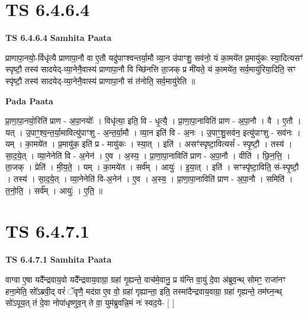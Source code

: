 \documentclass[17pt]{extarticle}
\begin{document}
\section{ TS 6.4.6.4 }

\textbf{TS 6.4.6.4 } \newline
\textbf{Samhita Paata} \newline

प्राणापा॒नयो॒-र्विधृ॑त्यै प्राणापा॒नौ वा ए॒तौ यदु॑पाꣳश्वन्तर्या॒मौ व्या॒न उ॑पाꣳशु॒ सव॑नो॒ यं का॒मये॑त प्र॒मायु॑कः स्या॒दित्यसꣳ॑ स्पृष्टौ॒ तस्य॑ सादयेद्-व्या॒नेनै॒वास्य॑ प्राणापा॒नौ वि च्छि॑नत्ति ता॒जक् प्र मी॑यते॒ यं का॒मये॑त॒ सर्व॒मायु॑रिया॒दिति॒ सꣳ स्पृ॑ष्टौ॒ तस्य॑ सादयेद्-व्या॒नेनै॒वास्य॑ प्राणापा॒नौ सं त॑नोति॒ सर्व॒मायु॑रेति ॥ \newline

\textbf{Pada Paata} \newline

प्रा॒णा॒पा॒नयो॒रिति॑ प्राण - अ॒पा॒नयोः᳚ । विधृ॑त्या॒ इति॒ वि - धृ॒त्यै॒ । प्रा॒णा॒पा॒नाविति॑ प्राण - अ॒पा॒नौ । वै । ए॒तौ । यत् । उ॒पाꣳ॒॒श्व॒न्त॒र्या॒मावित्यु॑पाꣳशु - अ॒न्त॒र्या॒मौ । व्या॒न इति॑ वि - अ॒नः । उ॒पाꣳ॒॒शु॒सव॑न॒ इत्यु॑पाꣳशु - सव॑नः । यम् । का॒मये॑त । प्र॒मायु॑क॒ इति॑ प्र - मायु॑कः । स्या॒त् । इति॑ । असꣳ॑स्पृष्टा॒वित्यसं᳚ - स्पृ॒ष्टौ॒ । तस्य॑ । सा॒द॒ये॒त् । व्या॒नेनेति॑ वि - अ॒नेन॑ । ए॒व । अ॒स्य॒ । प्रा॒णा॒पा॒नाविति॑ प्राण - अ॒पा॒नौ । वीति॑ । छि॒न॒त्ति॒ । ता॒जक् । प्रेति॑ । मी॒य॒ते॒ । यम् । का॒मये॑त । सर्व᳚म् । आयुः॑ । इ॒या॒त् । इति॑ । सꣳस्पृ॑ष्टा॒विति॒ सं-स्पृ॒ष्टौ॒ । तस्य॑ । सा॒द॒ये॒त् । व्या॒नेनेति॑ वि-अ॒नेन॑ । ए॒व । अ॒स्य॒ । प्रा॒णा॒पा॒नाविति॑ प्राण - अ॒पा॒नौ । समिति॑ । त॒नो॒ति॒ । सर्व᳚म् । आयुः॑ । ए॒ति॒ ॥  \newline





\section{ TS 6.4.7.1 }

\textbf{TS 6.4.7.1 } \newline
\textbf{Samhita Paata} \newline

वाग्वा ए॒षा यदै᳚न्द्रवाय॒वो यदै᳚न्द्रवाय॒वाग्रा॒ ग्रहा॑ गृ॒ह्यन्ते॒ वाच॑मे॒वानु॒ प्र य॑न्ति वा॒युं दे॒वा अ॑ब्रुव॒न्थ् सोमꣳ॒॒ राजा॑नꣳ हना॒मेति॒ सो᳚ऽब्रवी॒द् वरं॑ ॅवृणै॒ मद॑ग्रा ए॒व वो॒ ग्रहा॑ गृह्यान्ता॒ इति॒ तस्मा॑दैन्द्रवाय॒वाग्रा॒ ग्रहा॑ गृह्यन्ते॒ तम॑घ्न॒न्थ् सो॑ऽपूय॒त् तं दे॒वा नोपा॑धृष्णुव॒न् ते वा॒ युम॑ब्रुवन्नि॒मं नः॑ स्वद॒ये- [  ] \newline
\end{document}
